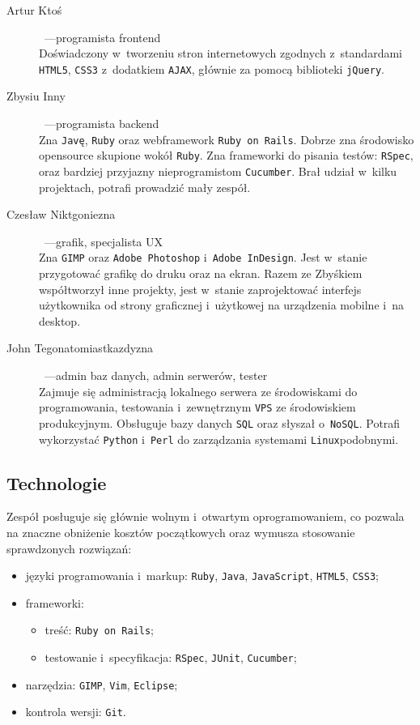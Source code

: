 \documentclass[10pt,a4paper]{article}
\begin{document}
\begin{description}
  \item[Artur Ktoś]~---\quad programista front\dywiz end \hfill \\
    Doświadczony w~tworzeniu stron internetowych zgodnych z~standardami
    \texttt{HTML5}, \texttt{CSS3} z~dodatkiem \texttt{AJAX}, głównie za pomocą
    biblioteki \texttt{jQuery}.
  \item[Zbysiu Inny]~---\quad programista back\dywiz end \hfill \\
    Zna \texttt{Javę}, \texttt{Ruby} oraz web\dywiz framework \texttt{Ruby on
    Rails}.  Dobrze zna środowisko open\dywiz source skupione wokół
    \texttt{Ruby}. Zna frameworki do pisania testów: \texttt{RSpec}, oraz
    bardziej przyjazny nie\dywiz programistom \texttt{Cucumber}. Brał udział
    w~kilku projektach, potrafi prowadzić mały zespół.
  \item[Czesław Niktgoniezna]~---\quad grafik, specjalista UX \hfill \\
    Zna \texttt{GIMP} oraz {\tt Adobe Photoshop} i~\texttt{Adobe InDesign}.
    Jest w~stanie przygotować grafikę do druku oraz na ekran. Razem ze Zbyśkiem
    współtworzył inne projekty, jest w~stanie zaprojektować interfejs
    użytkownika od strony graficznej i~użytkowej na urządzenia mobilne i~na
    desktop.
  \item[John Tegonatomiastkazdyzna]~---\quad admin baz danych, admin serwerów, tester \hfill \\
    Zajmuje się administracją lokalnego serwera ze środowiskami do
    programowania, testowania i~zewnętrznym \texttt{VPS} ze środowiskiem
    produkcyjnym. Obsługuje bazy danych \texttt{SQL} oraz słyszał
    o~\texttt{NoSQL}. Potrafi wykorzystać \texttt{Python} i~\texttt{Perl} do
    zarządzania systemami \texttt{Linux}\dywiz podobnymi.
\end{description}

\subsection{Technologie}
Zespół posługuje się głównie wolnym i~otwartym oprogramowaniem, co pozwala na
znaczne obniżenie kosztów początkowych oraz wymusza stosowanie sprawdzonych rozwiązań:
\begin{itemize}
  \item języki programowania i~markup: \texttt{Ruby}, \texttt{Java},
    \texttt{JavaScript}, \texttt{HTML5}, \texttt{CSS3};
  \item frameworki:
    \begin{itemize}
      \item treść: \texttt{Ruby on Rails};
      \item testowanie i~specyfikacja: \texttt{RSpec}, \texttt{JUnit},
        \texttt{Cucumber};
    \end{itemize}
  \item narzędzia: \texttt{GIMP}, \texttt{Vim}, \texttt{Eclipse};
  \item kontrola wersji: \texttt{Git}.
\end{itemize}
\end{document}

